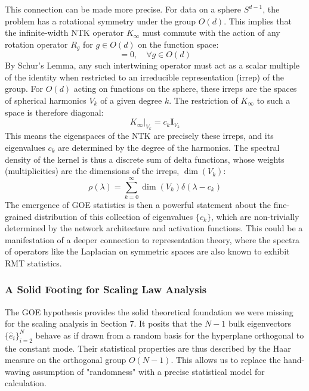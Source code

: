 \documentclass{article}
\begin{document}
This connection can be made more precise. For data on a sphere $S^{d-1}$, the problem has a rotational symmetry under the group $O(d)$. This implies that the infinite-width NTK operator $K_\infty$ must commute with the action of any rotation operator $R_g$ for $g \in O(d)$ on the function space:
\begin{equation}
[K_\infty, R_g] = 0, \quad \forall g \in O(d)
\end{equation}
By Schur's Lemma, any such intertwining operator must act as a scalar multiple of the identity when restricted to an irreducible representation (irrep) of the group. For $O(d)$ acting on functions on the sphere, these irreps are the spaces of spherical harmonics $V_k$ of a given degree $k$. The restriction of $K_\infty$ to such a space is therefore diagonal:
\begin{equation}
K_\infty|_{V_k} = c_k \mathbf{I}_{V_k}
\end{equation}
This means the eigenspaces of the NTK are precisely these irreps, and its eigenvalues $c_k$ are determined by the degree of the harmonics. The spectral density of the kernel is thus a discrete sum of delta functions, whose weights (multiplicities) are the dimensions of the irreps, $\dim(V_k)$:
\begin{equation}
\rho(\lambda) = \sum_{k=0}^\infty \dim(V_k) \delta(\lambda - c_k)
\end{equation}
The emergence of GOE statistics is then a powerful statement about the fine-grained distribution of this collection of eigenvalues $\{c_k\}$, which are non-trivially determined by the network architecture and activation functions. This could be a manifestation of a deeper connection to representation theory, where the spectra of operators like the Laplacian on symmetric spaces are also known to exhibit RMT statistics.

\subsubsection{A Solid Footing for Scaling Law Analysis}
The GOE hypothesis provides the solid theoretical foundation we were missing for the scaling analysis in Section 7. It posits that the $N-1$ bulk eigenvectors $\{\hat{e}_i\}_{i=2}^N$ behave as if drawn from a random basis for the hyperplane orthogonal to the constant mode. Their statistical properties are thus described by the Haar measure on the orthogonal group $O(N-1)$. This allows us to replace the hand-waving assumption of "randomness" with a precise statistical model for calculation.
\end{document}

